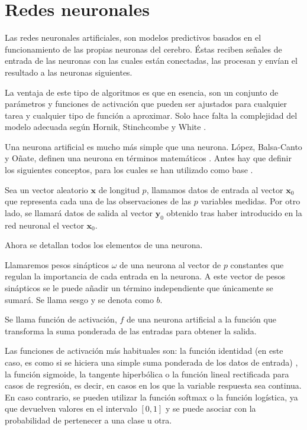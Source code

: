 \newpage
\section{Redes neuronales}

\noindent Las redes neuronales artificiales, son modelos predictivos basados en el funcionamiento de las propias neuronas del cerebro. Éstas reciben señales de entrada de las neuronas con las cuales están conectadas, las procesan y envían el resultado a las  neuronas siguientes. 

\noindent La ventaja de este tipo de algoritmos es que en esencia, son un conjunto de parámetros y funciones de activación que pueden ser ajustados para cualquier tarea y cualquier tipo de función a aproximar. Solo hace falta la complejidad del modelo adecuada según Hornik, Stinchcombe y  White \cite{Hornik 1989}.  

\noindent Una neurona artificial es mucho más simple que una neurona. López,  Balsa-Canto y  Oñate, definen una neurona en términos matemáticos \cite{Roberto 2008}. Antes hay que definir los siguientes conceptos, para los cuales se han utilizado como base \cite{Grossi 2007, Neural Designer}.

\noindent Sea un vector aleatorio $\mathbf{x}$ de longitud $p$, llamamos datos de entrada al vector $\mathbf{x}_0$ que representa cada una de las observaciones de las $p$  variables medidas. Por otro lado, se llamará datos de salida al vector $\mathbf{y}_0$ obtenido tras haber introducido en la red neuronal el vector $\mathbf{x}_0$.

\noindent Ahora se detallan todos los elementos de una neurona. 

\begin{defi}
Llamaremos pesos sinápticos $\omega$ de una neurona al vector de $p$ constantes que regulan la importancia de cada entrada en la neurona.  A este vector de pesos sinápticos se le puede añadir un término independiente que únicamente se sumará. Se llama sesgo y se denota como $b$.
\end{defi}

\begin{defi}
Se llama función de activación, $f$ de una neurona artificial a la función que transforma la suma ponderada de las entradas para obtener la salida. 

\noindent Las funciones de activación más habituales son: la función identidad (en este caso, es como si se hiciera una simple suma ponderada de los datos de entrada) , la función sigmoide, la tangente hiperbólica o la función lineal rectificada para casos de regresión, es decir, en casos en los que la variable respuesta sea continua. En caso contrario, se pueden utilizar la función softmax o la función logística, ya que devuelven valores en el intervalo $[0,1]$ y se puede asociar con la probabilidad de pertenecer a una clase u otra. 
\end{defi}

